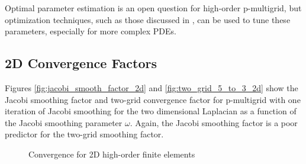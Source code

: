 \documentclass[review]{siamart190516}
\begin{document}
Optimal parameter estimation is an open question for high-order p-multigrid, but optimization techniques, such as those discussed in \cite{brown2021tuning}, can be used to tune these parameters, especially for more complex PDEs.

\subsection{2D Convergence Factors}\label{sec:2dresults}

Figures \ref{fig:jacobi_smooth_factor_2d} and \ref{fig:two_grid_5_to_3_2d} show the Jacobi smoothing factor and two-grid convergence factor for p-multigrid with one iteration of Jacobi smoothing for the two dimensional Laplacian as a function of the Jacobi smoothing parameter $\omega$.
Again, the Jacobi smoothing factor is a poor predictor for the two-grid smoothing factor.

\begin{figure}[!tbp]
  \centering
  \hfill
  \caption{Convergence for 2D high-order finite elements}
\end{figure}
\end{document}
